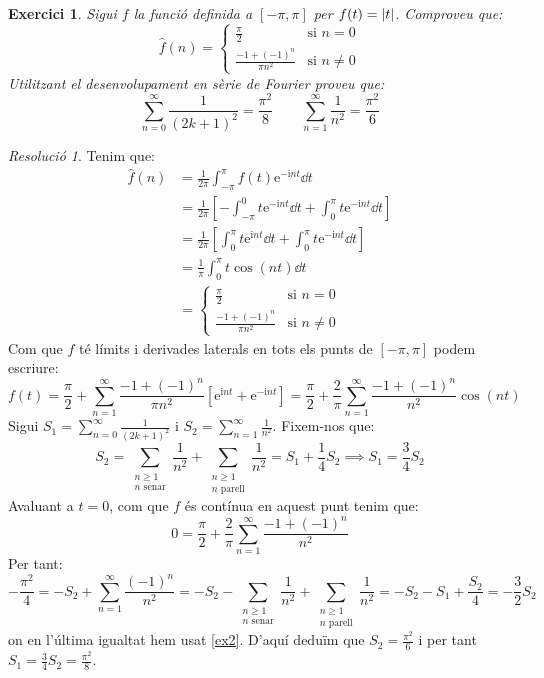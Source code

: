 \documentclass[10pt,a4paper]{article}
\newcommand{\ii}{\mathrm{i}} %
\newtheorem{exercici}{Exercici}
\theoremstyle{definition}
\theoremstyle{remark}
\newtheorem*{res}{Resolució}
\renewcommand{\exp}[1]{\mathrm{e}^{#1}} %
\begin{document}
\begin{exercici}
  Sigui $f$ la funció definida a $[-\pi,\pi]$ per $f(t)=\abs{t}$. Comproveu que:
  $$\widehat{f}(n)=\begin{cases}
      \frac{\pi}{2}               & \text{si }n=0    \\
      \frac{-1+{(-1)}^n}{\pi n^2} & \text{si }n\ne 0
    \end{cases}$$
  Utilitzant el desenvolupament en sèrie de Fourier proveu que:
  $$\sum_{n=0}^\infty\frac{1}{{(2k+1)}^2}=\frac{\pi^2}{8}\qquad\sum_{n=1}^\infty\frac{1}{n^2}=\frac{\pi^2}{6}$$
\end{exercici}
\begin{res}
  Tenim que:
  \begin{align*}
    \widehat{f}(n) & =\frac{1}{2\pi}\int_{-\pi}^{\pi}f(t)\exp{-\ii n t}\dd{t}                                              \\
                   & =\frac{1}{2\pi}\left[-\int_{-\pi}^{0}t\exp{-\ii n t}\dd{t}+\int_{0}^{\pi}t\exp{-\ii n t}\dd{t}\right] \\
                   & =\frac{1}{2\pi}\left[\int_{0}^{\pi}t\exp{\ii n t}\dd{t}+\int_{0}^{\pi}t\exp{-\ii n t}\dd{t}\right]    \\
                   & =\frac{1}{\pi}\int_0^\pi t\cos(n t)\dd{t}                                                             \\
                   & =\begin{cases}
                        \frac{\pi}{2}               & \text{si }n=0    \\
                        \frac{-1+{(-1)}^n}{\pi n^2} & \text{si }n\ne 0
                      \end{cases}
  \end{align*}
  Com que $f$ té límits i derivades laterals en tots els punts de $[-\pi,\pi]$ podem escriure: $$f(t)=\frac{\pi}{2}+\sum_{n=1}^\infty\frac{-1+{(-1)}^n}{\pi n^2}\left[\exp{\ii n t}+\exp{-\ii n t}\right]=\frac{\pi}{2}+\frac{2}{\pi}\sum_{n=1}^\infty\frac{-1+{(-1)}^n}{n^2}\cos(n t)$$
  Sigui $S_1=\sum_{n=0}^\infty\frac{1}{{(2k+1)}^2}$ i $S_2=\sum_{n=1}^\infty\frac{1}{n^2}$. Fixem-nos que:
  \begin{equation}\label{ex2}
    S_2=\sum_{\substack{n\geq 1\\n\text{ senar}}}\frac{1}{n^2}+\sum_{\substack{n\geq 1\\n\text{ parell}}}\frac{1}{n^2}=S_1+\frac{1}{4}S_2\implies S_1=\frac{3}{4}S_2
  \end{equation}
  Avaluant a $t=0$, com que $f$ és contínua en aquest punt tenim que:
  $$0=\frac{\pi}{2}+\frac{2}{\pi}\sum_{n=1}^\infty\frac{-1+{(-1)}^n}{n^2}$$
  Per tant:
  $$-\frac{\pi^2}{4}=-S_2+\sum_{n=1}^{\infty}\frac{{(-1)}^n}{n^2}=-S_2-\sum_{\substack{n\geq 1\\n\text{ senar}}}\frac{1}{n^2}+\sum_{\substack{n\geq 1\\n\text{ parell}}}\frac{1}{n^2}=-S_2-S_1+\frac{S_2}{4}=-\frac{3}{2}S_2$$
  on en l'última igualtat hem usat \eqref{ex2}. D'aquí deduïm que $S_2=\frac{\pi^2}{6}$ i per tant $S_1=\frac{3}{4}S_2=\frac{\pi^2}{8}$.
\end{res}
\end{document}
